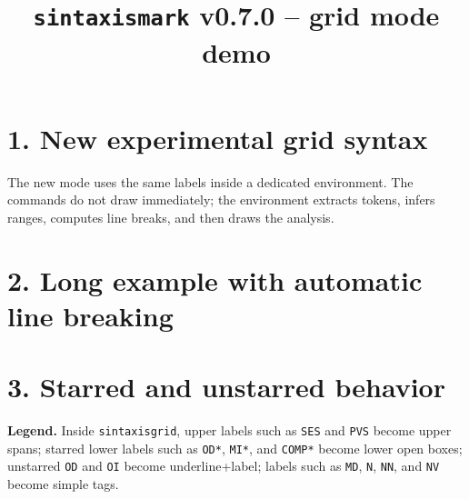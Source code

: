 \documentclass[12pt]{article}
\title{\texttt{sintaxismark} v0.7.0 -- grid mode demo}
\author{}
\date{}
\begin{document}
\maketitle

\section*{1. New experimental grid syntax}

The new mode uses the same labels inside a dedicated environment. The commands do not draw immediately; the environment extracts tokens, infers ranges, computes line breaks, and then draws the analysis.

\begin{sintaxisgrid}[width=12cm]
\end{sintaxisgrid}

\section*{2. Long example with automatic line breaking}

\begin{sintaxisgrid}[width=13cm]
\end{sintaxisgrid}

\section*{3. Starred and unstarred behavior}

\begin{sintaxisgrid}[width=12cm]
\end{sintaxisgrid}

\bigskip
\noindent\textbf{Legend.} Inside \texttt{sintaxisgrid}, upper labels such as \texttt{SES} and \texttt{PVS} become upper spans; starred lower labels such as \texttt{OD*}, \texttt{MI*}, and \texttt{COMP*} become lower open boxes; unstarred \texttt{OD} and \texttt{OI} become underline+label; labels such as \texttt{MD}, \texttt{N}, \texttt{NN}, and \texttt{NV} become simple tags.
\end{document}
